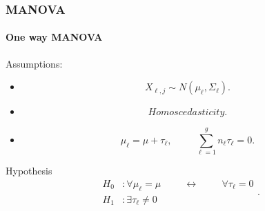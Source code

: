 \documentclass[aspectratio=169,10pt,t]{beamer}
\begin{document}
\begin{frame}[t]
	\frametitle{MANOVA}
	\framesubtitle{One way MANOVA}

	Assumptions:
	\begin{itemize}
	\item 
	\[
		X_{\ell,j} \sim N \left( \mu_\ell , \Sigma_\ell  \right) 
	.\] 
	\item \[Homoscedasticity .\]
	\item 
		\[
			\mu_\ell = \mu + \tau_\ell, \hspace{1cm} \sum^{g}_{\ell = 1} n_{\ell}\tau_{\ell}=0
		.\] 
	\end{itemize}
	Hypothesis
	\[
	\begin{aligned}
		H_0 &: \forall \mu_\ell = \mu \hspace{1cm} \leftrightarrow 
		\hspace{1cm} \forall \tau_\ell = 0\\
		H_1 &: \exists \tau_\ell \neq 0
	\end{aligned}
	.\] 

\end{frame}
\end{document}
